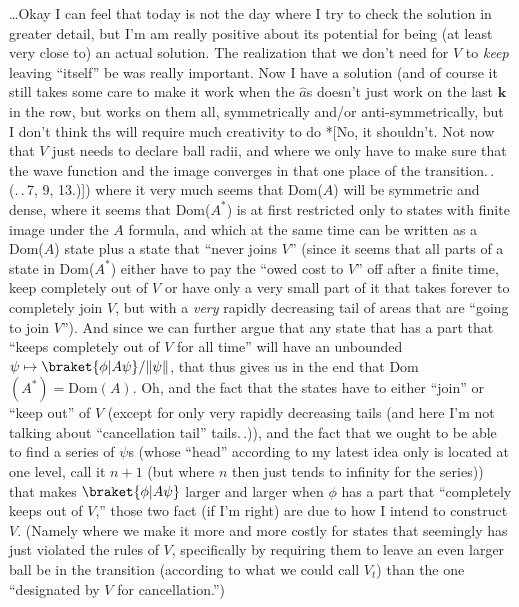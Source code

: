 \documentclass{report}
\begin{document}
\ldots Okay I can feel that today is not the day where I try to check the solution in greater %
detail, but I'm am really positive about its potential for being (at least very close to) an actual solution. The realization that we don't need for $V$ to \emph{keep} leaving ``itself'' be was really important. Now I have a solution (and of course it still takes some care to make it work when the $\hat a$s doesn't just work on the last $\mathbf{k}$ in the row, but works on them all, symmetrically and/or anti-symmetrically, but I don't think ths will require much creativity to do *[No, it shouldn't. Not now that $V$ just needs to declare ball radii, and where we only have to make sure that the wave function and the image converges in that one place of the transition.\,. (.\,.\,7, 9, 13.)]) where it very much seems that Dom($A$) will be symmetric and dense, where it seems that Dom($A^*$) is at first restricted only to states with finite image under the $A$ formula, and which at the same time can be written as a Dom($A$) state plus a state that ``never joins $V$'' (since it seems that all parts of a state in Dom($A^*$) either have to pay the ``owed cost to $V$'' off after a finite time, keep completely out of $V$ or have only a very small part of it that takes forever to completely join $V$, but with a \emph{very} rapidly decreasing tail of areas that are ``going to join $V$''). And since we can further argue that any state that has a part that ``keeps completely out of $V$ for all time'' will have an unbounded $\psi \mapsto \braket{\phi | A \psi}/\|\psi\|$, %
that thus gives us in the end that Dom$(A^*) = \mathrm{Dom}(A)$. Oh, and the fact that the states have to either ``join'' or ``keep out'' of $V$ (except for only very rapidly decreasing tails (and here I'm not talking about ``cancellation tail'' tails.\,.)), and the fact that we ought to be able to find a series of $\psi$s (whose ``head'' according to my latest idea only is located at one level, call it $n+1$ (but where $n$ then just tends to infinity for the series)) that makes $\braket{\phi | A \psi}$ larger and larger when $\phi$ has a part that ``completely keeps out of $V$,'' those two fact (if I'm right) are due to how I intend to construct $V$. (Namely where we make it more and more costly for states that seemingly has just violated the rules of $V$, specifically by requiring them to leave an even larger ball be in the transition (according to what we could call $V_t$) than the one ``designated by $V$ for cancellation.'') %
\end{document}
